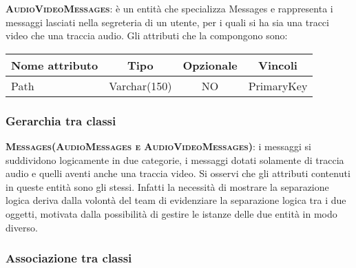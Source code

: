 \begin{description}
	\item{\scshape\bfseries AudioVideoMessages}: è un entità che specializza Messages e rappresenta i messaggi lasciati nella segreteria di un utente, per i quali si ha sia una tracci video che una traccia audio. Gli attributi che la compongono sono:
	
\begin{center}
\begin{tabular}{lccc}
\toprule
Nome attributo & Tipo & Opzionale & Vincoli\\
\midrule %
Path & Varchar(150) & NO & PrimaryKey\\
\bottomrule
\end{tabular}
\end{center}		
	
\end{description}

\subsubsection{Gerarchia tra classi}

\begin{description}
	\item{\scshape\bfseries Messages(AudioMessages e AudioVideoMessages)}: i messaggi si suddividono logicamente in due categorie, i messaggi dotati solamente di traccia audio e quelli aventi anche una traccia video. Si osservi che gli attributi contenuti in queste entità sono gli stessi. Infatti la necessità di mostrare la separazione logica deriva dalla volontà del team di evidenziare la separazione logica tra i due oggetti, motivata dalla possibilità di gestire le istanze delle due entità in modo diverso.
\end{description}

\subsubsection{Associazione tra classi}

